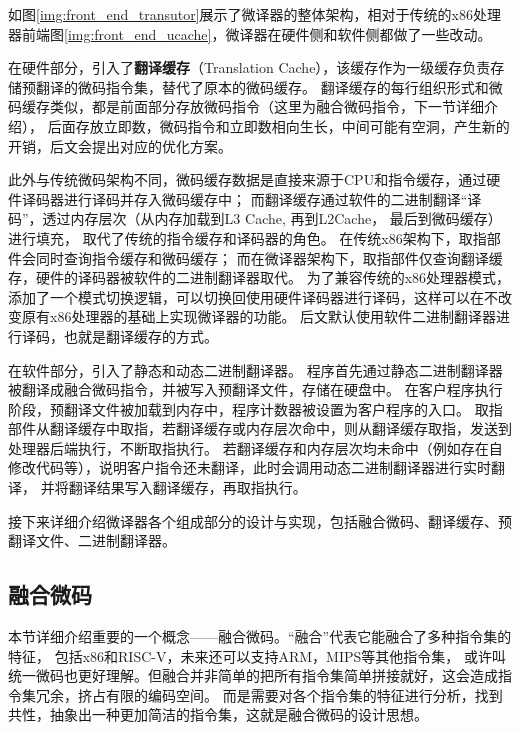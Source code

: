 如图\ref{img:front_end_transutor}展示了微译器的整体架构，相对于传统的x86处理器前端图\ref{img:front_end_ucache}，微译器在硬件侧和软件侧都做了一些改动。


在硬件部分，引入了\textbf{翻译缓存}（Translation Cache），该缓存作为一级缓存负责存储预翻译的微码指令集，替代了原本的微码缓存。
翻译缓存的每行组织形式和微码缓存类似，都是前面部分存放微码指令（这里为融合微码指令，下一节详细介绍），
后面存放立即数，微码指令和立即数相向生长，中间可能有空洞，产生新的开销，后文会提出对应的优化方案。

此外与传统微码架构不同，微码缓存数据是直接来源于CPU和指令缓存，通过硬件译码器进行译码并存入微码缓存中；
而翻译缓存通过软件的二进制翻译“译码”，透过内存层次（从内存加载到L3 Cache, 再到L2Cache， 最后到微码缓存）进行填充，
取代了传统的指令缓存和译码器的角色。
在传统x86架构下，取指部件会同时查询指令缓存和微码缓存；
而在微译器架构下，取指部件仅查询翻译缓存，硬件的译码器被软件的二进制翻译器取代。
为了兼容传统的x86处理器模式，添加了一个模式切换逻辑，可以切换回使用硬件译码器进行译码，这样可以在不改变原有x86处理器的基础上实现微译器的功能。
后文默认使用软件二进制翻译器进行译码，也就是翻译缓存的方式。


在软件部分，引入了静态和动态二进制翻译器。
程序首先通过静态二进制翻译器被翻译成融合微码指令，并被写入预翻译文件，存储在硬盘中。
在客户程序执行阶段，预翻译文件被加载到内存中，程序计数器被设置为客户程序的入口。
取指部件从翻译缓存中取指，若翻译缓存或内存层次命中，则从翻译缓存取指，发送到处理器后端执行，不断取指执行。
若翻译缓存和内存层次均未命中（例如存在自修改代码等），说明客户指令还未翻译，此时会调用动态二进制翻译器进行实时翻译，
并将翻译结果写入翻译缓存，再取指执行。

接下来详细介绍微译器各个组成部分的设计与实现，包括融合微码、翻译缓存、预翻译文件、二进制翻译器。

\subsection{融合微码}\label{sec:tisa}
本节详细介绍重要的一个概念——融合微码。“融合”代表它能融合了多种指令集的特征，
包括x86和RISC-V，未来还可以支持ARM，MIPS等其他指令集，
或许叫统一微码也更好理解。但融合并非简单的把所有指令集简单拼接就好，这会造成指令集冗余，挤占有限的编码空间。
而是需要对各个指令集的特征进行分析，找到共性，抽象出一种更加简洁的指令集，这就是融合微码的设计思想。

